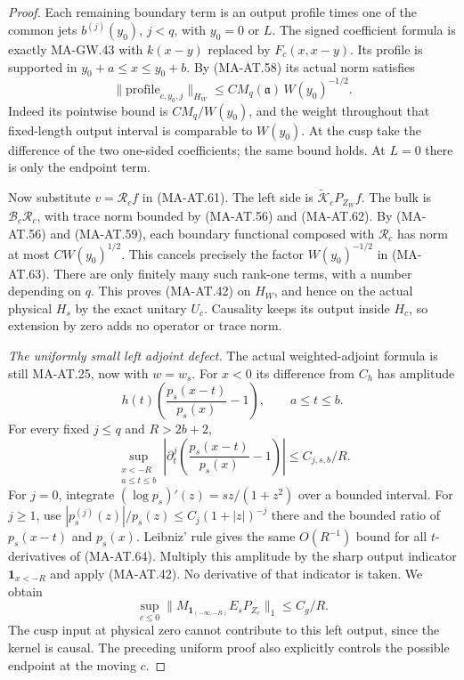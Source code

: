 \begin{proof}
Each remaining boundary term is an output profile times
one of the common jets \(b^{(j)}(y_0)\), \(j<q\), with
\(y_0=0\) or \(L\).
The signed coefficient formula is exactly MA-GW.43 with
\(k(x-y)\) replaced by \(F_c(x,x-y)\).
Its profile is supported in
\(y_0+a\le x\le y_0+b\).
By (MA-AT.58) its actual norm satisfies
\[
 \|\text{profile}_{c,y_0,j}\|_{H_W}
                \le C M_q(\mathfrak a)\,W(y_0)^{-1/2}.
 \tag{MA-AT.63}
\]
Indeed its pointwise bound is \(C M_q/W(y_0)\), and
the weight throughout that fixed-length output interval
is comparable to \(W(y_0)\).
At the cusp take the difference of the two one-sided
coefficients; the same bound holds.  At \(L=0\) there
is only the endpoint term.

Now substitute \(v=\mathcal R_cf\) in (MA-AT.61).
The left side is
\(\widetilde{\mathcal K}_cP_{Z_W}f\).
The bulk is \(\mathcal B_c\mathcal R_c\), with trace norm
bounded by (MA-AT.56) and (MA-AT.62).
By (MA-AT.56) and (MA-AT.59), each boundary functional
composed with \(\mathcal R_c\) has norm at most
\(C W(y_0)^{1/2}\).
This cancels precisely the factor \(W(y_0)^{-1/2}\)
in (MA-AT.63).
There are only finitely many such rank-one terms,
with a number depending on \(q\).
This proves (MA-AT.42) on \(H_W\), and hence on the
actual physical \(H_s\) by the exact unitary \(U_c\).
Causality keeps its output inside \(H_c\), so extension
by zero adds no operator or trace norm.

\emph{The uniformly small left adjoint defect.}
The actual weighted-adjoint formula is still MA-AT.25,
now with \(w=w_s\).
For \(x<0\) its difference from \(C_h\) has amplitude
\[
 h(t)\left(\frac{p_s(x-t)}{p_s(x)}-1\right),
                       \qquad a\le t\le b.
 \tag{MA-AT.64}
\]
For every fixed \(j\le q\) and \(R>2b+2\),
\[
 \sup_{\substack{x<-R\\a\le t\le b}}
 \left|\partial_t^j
        \left(\frac{p_s(x-t)}{p_s(x)}-1\right)\right|
                              \le C_{j,s,b}/R .
 \tag{MA-AT.65}
\]
For \(j=0\), integrate
\((\log p_s)'(z)=sz/(1+z^2)\) over a bounded interval.
For \(j\ge1\), use
\(|p_s^{(j)}(z)|/p_s(z)\le C_j(1+|z|)^{-j}\)
there and the bounded ratio of \(p_s(x-t)\) and \(p_s(x)\).
Leibniz' rule gives the same \(O(R^{-1})\) bound for
all \(t\)-derivatives of (MA-AT.64).
Multiply this amplitude by the sharp output indicator
\(\mathbf1_{x<-R}\) and apply (MA-AT.42).
No derivative of that indicator is taken.  We obtain
\[
          \sup_{c\le0}
             \|M_{\mathbf1_{(-\infty,-R)}}E_sP_{Z_c}\|_1
                              \le C_g/R .
 \tag{MA-AT.66}
\]
The cusp input at physical zero cannot contribute to this
left output, since the kernel is causal.
The preceding uniform proof also explicitly controls the
possible endpoint at the moving \(c\).


\end{proof}
